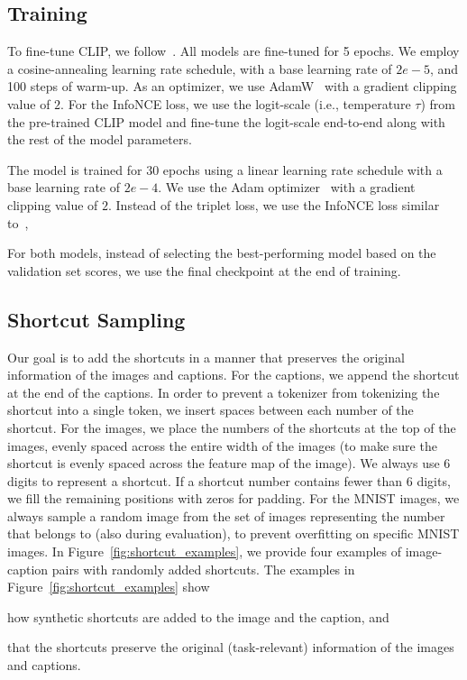 \subsection{Training}
\label{app:experimental-training}

 To fine-tune CLIP, we follow~\citep{yuksekgonul2023when}.
All models are fine-tuned for 5 epochs.
We employ a cosine-annealing learning rate schedule, with a base learning rate of $2e-5$, and 100 steps of warm-up.
As an optimizer, we use AdamW~\citep{loshchilov2019decoupled} with a gradient clipping value of $2$.
For the InfoNCE loss, we use the logit-scale (i.e., temperature $\tau$) from the pre-trained CLIP model and fine-tune the logit-scale end-to-end along with the rest of the model parameters.

 The model is trained for 30 epochs using a linear learning rate schedule with a base learning rate of $2e-4$. We use the Adam optimizer~\citep{kingma2014_adam} with a gradient clipping value of $2$. Instead of the triplet loss, we use the InfoNCE loss similar to~\cite{radford2021learning},

For both models, instead of selecting the best-performing model based on the validation set scores, we use the final checkpoint at the end of training. 


\subsection{Shortcut Sampling}
\label{app:experimental-shortcutsampling}

Our goal is to add the shortcuts in a manner that preserves the original information of the images and captions. 
For the captions, we append the shortcut at the end of the captions.
In order to prevent a tokenizer from tokenizing the shortcut into a single token, we insert spaces between each number of the shortcut.
For the images, we place the numbers of the shortcuts at the top of the images, evenly spaced across the entire width of the images (to make sure the shortcut is evenly spaced across the feature map of the image).
We always use 6 digits to represent a shortcut.  
If a shortcut number contains fewer than 6 digits, we fill the remaining positions with zeros for padding.
For the MNIST images, we always sample a random image from the set of images representing the number that belongs to (also during evaluation), to prevent overfitting on specific MNIST images. 
In Figure~\ref{fig:shortcut_examples}, we provide four examples of image-caption pairs with randomly added shortcuts. 
The examples in Figure~\ref{fig:shortcut_examples} show 
\begin{enumerate*}[label=(\roman*)]
	\item how synthetic shortcuts are added to the image and the caption, and 
	\item that the shortcuts preserve the original (task-relevant) information of the images and captions.
\end{enumerate*}

